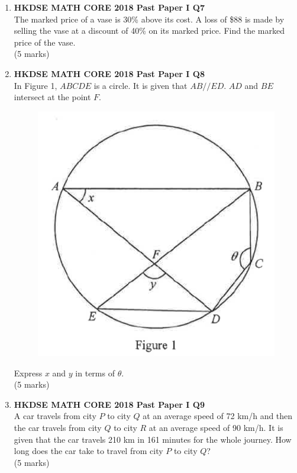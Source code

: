 \documentclass[12pt]{article}
\begin{document}
\begin{enumerate}
	\item \textbf{HKDSE MATH CORE 2018 Past Paper I Q7}\\
	The marked price of a vase is 30\% above its cost. A loss of \$88 is made by selling the vase at a discount of 40\% on its marked price. Find the marked price of the vase. \\(5 marks)
	
	\item \textbf{HKDSE MATH CORE 2018 Past Paper I Q8}\\
	In Figure 1, $ABCDE$ is a circle. It is given that $AB // ED$. $AD$ and $BE$ intersect at the point $F$.
	\begin{figure}[H]
		\centering
		\includegraphics[width = .3\linewidth]{2018Figure1.1}
	\end{figure}
	Express $x$ and $y$ in terms of $\theta$. \\(5 marks)
	
	
	\item \textbf{HKDSE MATH CORE 2018 Past Paper I Q9}\\
	A car travels from city $P$ to city $Q$ at an average speed of 72 km/h and then the car travels from city $Q$ to city $R$ at an average speed of 90 km/h. It is given that the car travels 210 km in 161 minutes for the whole journey. How long does the car take to travel from city $P$ to city $Q$? \\(5 marks)


\end{enumerate}
\end{document}
